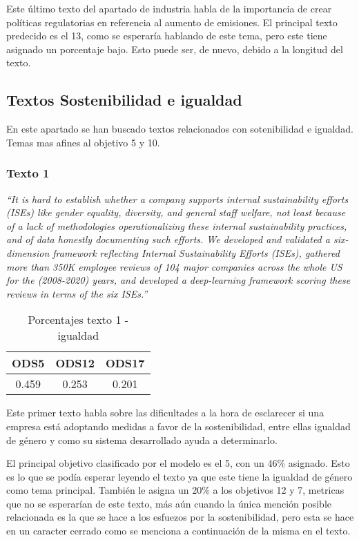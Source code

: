 Este último texto del apartado de industria habla de la importancia de crear
políticas regulatorias en referencia al aumento de emisiones. El principal texto
predecido es el 13, como se esperaría hablando de este tema, pero este tiene
asignado un porcentaje bajo. Esto puede ser, de nuevo, debido a la longitud del
texto. 

\subsection{Textos Sostenibilidad e igualdad}

En este apartado se han buscado textos relacionados con sotenibilidad e
igualdad. Temas mas afines al objetivo 5 y 10.

\subsubsection{Texto 1}
\begin{center}
    \textit{``It is hard to establish whether a company supports internal
    sustainability efforts (ISEs) like gender equality, diversity, and general
    staff welfare, not least because of a lack of methodologies operationalizing
    these internal sustainability practices, and of data honestly documenting
    such efforts. We developed and validated a six-dimension framework
    reflecting Internal Sustainability Efforts (ISEs), gathered more than 350K
    employee reviews of 104 major companies across the whole US for the
    (2008-2020) years, and developed a deep-learning framework scoring these
    reviews in terms of the six ISEs.''}\cite{validationtexts6}
    \begin{table}[H]
        \begin{tabular}{c | c | c }
            \hline
            ODS5 & ODS12 & ODS17 \\ \hline
            0.459 & 0.253 & 0.201\\ \hline
        \end{tabular}
        \caption{Porcentajes texto 1 - igualdad}
\end{table}
\end{center}

Este primer texto habla sobre las dificultades a la hora de esclarecer si una
empresa está adoptando medidas a favor de la sostenibilidad, entre ellas
igualdad de género y como su sistema desarrollado ayuda a determinarlo. 

El principal objetivo clasificado por el modelo es el 5, con un 46\% asignado.
Esto es lo que se podía esperar leyendo el texto ya que este tiene la igualdad
de género como tema principal. También le asigna un 20\% a los objetivos 12 y 7,
metricas que no se esperarían de este texto, más aún cuando la única mención
posible relacionada es la que se hace a los esfuezos por la sostenibilidad, pero
esta se hace en un caracter cerrado como se menciona a continuación de la misma
en el texto.

